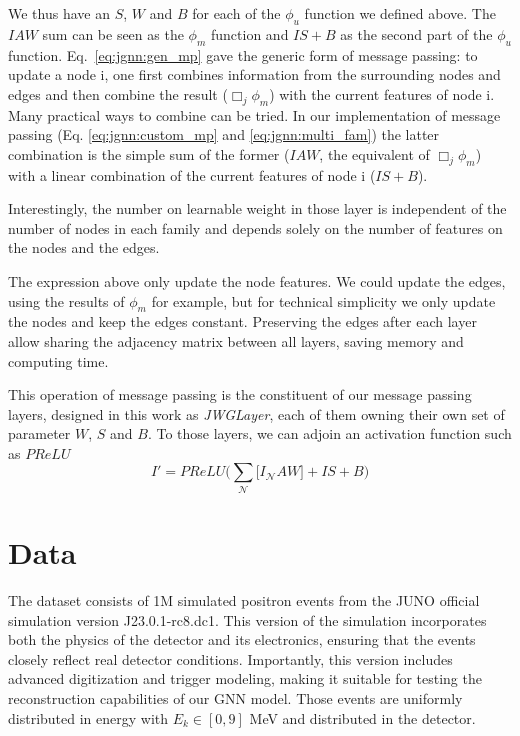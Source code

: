 \documentclass[../main.tex]{subfiles}
\begin{document}
We thus have an $S$, $W$ and $B$ for each of the $\phi_u$ function we defined above. The $IAW$ sum can be seen as the $\phi_m$ function and $IS+B$ as the second part of the $\phi_u$ function.
Eq.\ \ref{eq:jgnn:gen_mp} gave the generic form of message passing: to update a node i, one first combines information from the surrounding nodes and edges and then combine the result ($\Box_j \phi_m$) with the current features of node i.
Many practical ways to combine can be tried. In our implementation of message passing (Eq. \ref{eq:jgnn:custom_mp} and \ref{eq:jgnn:multi_fam}) the latter combination is the simple sum of the former ($IAW$, the equivalent of $\Box_j \phi_m$) with a linear combination of the current features of node i ($IS+B$).

Interestingly, the number on learnable weight in those layer is independent of the number of nodes in each family and depends solely on the number of features on the nodes and the edges.

The expression above only update the node features. We could update the edges, using the results of $\phi_m$ for example, but for technical simplicity we only update the nodes and keep the edges constant. Preserving the edges after each layer allow sharing the adjacency matrix between all layers, saving memory and computing time.

This operation of message passing is the constituent of our message passing layers, designed in this work as \textit{JWGLayer}, each of them owning their own set of parameter $W$, $S$ and $B$. To those layers, we can adjoin an activation function such as $PReLU$
\begin{equation}
  I' = PReLU\bigg(\sum_\mathcal{N} \bigg[ I_{\mathcal{N}}AW \bigg] + IS + B \bigg)
\end{equation}


\section{Data}


The dataset consists of 1M simulated positron events from the JUNO official simulation version J23.0.1-rc8.dc1. This version of the simulation incorporates both the physics of the detector and its electronics, ensuring that the events closely reflect real detector conditions. Importantly, this version includes advanced digitization and trigger modeling, making it suitable for testing the reconstruction capabilities of our GNN model. Those events are uniformly distributed in energy with $E_k \in [0, 9]$ MeV and distributed in the detector.
\end{document}
